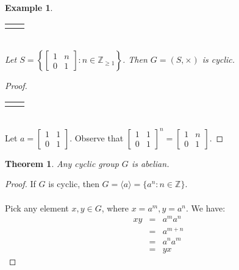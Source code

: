 \documentclass{article}
\theoremstyle{MyNonumberplain}
\theoremstyle{break}
\newtheorem*{proof}{Proof. }
\newcommand{\Z}{\mathbb{Z}}
\newcommand{\cyclic}[1]{\langle #1 \rangle}
\newcommand{\nline}{\begin{tabular}{ll}&\\\end{tabular}}
\theoremstyle{break}
\newtheorem{theorem}{Theorem}[section]
\newtheorem{example}{Example}[section]
\theoremstyle{break}
\theoremstyle{definition}
\theoremstyle{break}
\begin{document}
\begin{expbox}
    \begin{example}
        \nline\\
        Let $S = \left\{ \left[\begin{array}{cc}
            1 & n\\
            0 & 1
          \end{array}\right] : n \in \mathbb{Z}_{\geqslant 1} \right\}$. Then $G = (S,
          \times)$ is cyclic.
    \end{example}
    \begin{prfbox}
        \begin{proof}
            \nline\\
            Let $a = \left[\begin{array}{cc}
                1 & 1\\
                0 & 1
              \end{array}\right]$. Observe that $\left[\begin{array}{cc}
                1 & 1\\
                0 & 1
              \end{array}\right]^n = \left[\begin{array}{cc}
                1 & n\\
                0 & 1
              \end{array}\right]$.
        \end{proof}
    \end{prfbox}
\end{expbox}




\newpage

\begin{thmbox}
    \begin{theorem}
        Any cyclic group $G$ is abelian.
    \end{theorem}
    \begin{prfbox}
        \begin{proof}
            If $G$ is cyclic, then $G=\cyclic{a}=\{a^n:n\in\Z\}$.\\\\
            Pick any element $x,y\in G$, where $x=a^m,y=a^n$. We have:
            \begin{eqnarray*}
                xy & = & a^ma^n\\
                   & = & a^{m+n}\\
                   & = & a^na^m\\
                   & = & yx
            \end{eqnarray*}
        \end{proof}
    \end{prfbox}    
\end{thmbox}
\end{document}
